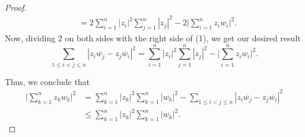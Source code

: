 \documentclass[a4paper]{article}
\begin{document}
\begin{proof}
\begin{align*}
                                                                                                                    &= 2 \sum_{ i=1  }^{ n } | {z}_{i} |^{2} \sum_{ j=1  }^{ n } | {z}_{j} |^{2} - 2 \Big| \sum_{ i=1  }^{ n } {z}_{i} {w}_{i} \Big|^{2}.  
        \end{align*}
        Now, dividing \( 2  \) on both sides with the right side of (1), we get our desired result
        \[ \sum_{ 1 \leq i < j \leq n  }^{  } | {z}_{i} \overline{{w}_{j}} - {z}_{j} \overline{{w}_{i}} |^{2} = \sum_{ i=1  }^{ n } | {z}_{i} |^{2} \sum_{ j=1  }^{ n } | {z}_{j} |^{2} - \Big| \sum_{ i=1  }^{ n } {z}_{i} {w}_{i} \Big|^{2}.   \]
        

        Thus, we conclude that 
        \begin{align*}   \Big| \sum_{ k=1  }^{ n } {z}_{k} {w}_{k} \Big|^{2} &= \sum_{ k=1  }^{ n } | {z}_{k} |^{2} \sum_{ k=1  }^{ n } | {w}_{k } |^{2} - \sum_{ 1 \leq i < j \leq n  }^{  } | {z}_{i} \overline{{w}_{j}} - {z}_{j} \overline{{w}_{i}} |^{2} \\  
            &\leq \sum_{ k=1  }^{ n } | {z}_{k } |^{2} \sum_{ k=1  }^{ n } | {w}_{k } |^{2}.  
        \end{align*}

        \end{proof}
\end{document}
